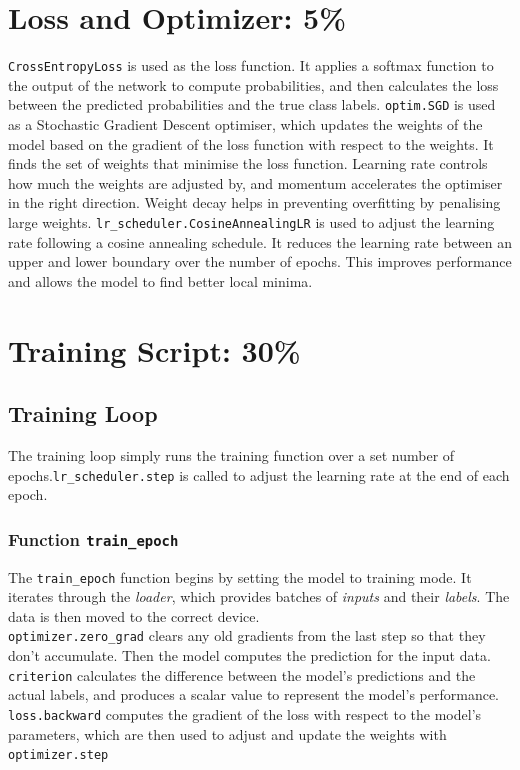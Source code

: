 \documentclass[12pt]{article}
\begin{document}
\section{Loss and Optimizer: 5\%}
\texttt{CrossEntropyLoss} is used as the loss function. It applies a softmax function to the output of the network to compute probabilities, and then calculates the loss between the predicted probabilities and the true class labels. \texttt{optim.SGD} is used as a Stochastic Gradient Descent optimiser, which updates the weights of the model based on the gradient of the loss function with respect to the weights. It finds the set of weights that minimise the loss function. Learning rate controls how much the weights are adjusted by, and momentum accelerates the optimiser in the right direction. Weight decay helps in preventing overfitting by penalising large weights. \texttt{lr\_scheduler.CosineAnnealingLR} is used to adjust the learning rate following a cosine annealing schedule. It reduces the learning rate between an upper and lower boundary over the number of epochs. This improves performance and allows the model to find better local minima.

\section{Training Script: 30\%}
\subsection{Training Loop}
The training loop simply runs the training function over a set number of epochs.\texttt{lr\_scheduler.step} is called to adjust the learning rate at the end of each epoch.

\subsubsection{Function \texttt{train\_epoch}}
The \texttt{train\_epoch} function begins by setting the model to training mode. It iterates through the \textit{loader}, which provides batches of \textit{inputs} and their \textit{labels}. The data is then moved to the correct device.\\ \texttt{optimizer.zero\_grad} clears any old gradients from the last step so that they don't accumulate. Then the model computes the prediction for the input data. \texttt{criterion} calculates the difference between the model's predictions and the actual labels, and produces a scalar value to represent the model's performance. \texttt{loss.backward} computes the gradient of the loss with respect to the model's parameters, which are then used to adjust and update the weights with \texttt{optimizer.step}
\end{document}
